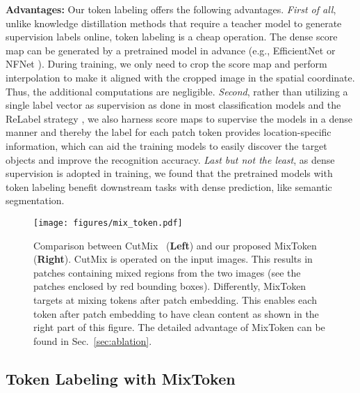 \documentclass{article}
\newcommand{\myPara}[1]{\noindent\textbf{#1:}}
\begin{document}
\myPara{Advantages} Our token labeling offers the following advantages. 
\emph{First of all}, unlike knowledge distillation methods that require a teacher model to generate supervision labels online, 
token labeling is a cheap operation. 
The dense score map can be generated by a pretrained model in advance
(e.g., EfficientNet \cite{tan2019efficientnet} or NFNet \cite{brock2021high}).
During training, we only need to crop the score map and perform interpolation to make it aligned with the cropped image in the spatial coordinate.
Thus, the additional computations are negligible.
\emph{Second}, rather than utilizing a single label vector as supervision as done in most classification models 
and the ReLabel strategy \cite{yun2021relabel},
we also harness score maps to supervise the models in a dense manner and thereby
the label for each patch token provides location-specific information, 
which can aid the training models to easily discover the target objects and improve the recognition accuracy.
\emph{Last but not the least}, as dense supervision is adopted in training, 
we found that the pretrained models with token labeling benefit downstream tasks with dense prediction, like semantic segmentation.



\begin{SCfigure}
\caption{Comparison between CutMix~\cite{yun2019cutmix} (\textbf{Left}) and our proposed MixToken (\textbf{Right}).
    CutMix is operated on the input images. This results in patches containing mixed regions from the two images
    (see the patches enclosed by red bounding boxes).
    Differently, MixToken targets at mixing tokens after patch embedding. This enables each token
    after patch embedding to have clean content as shown in the right part of this figure. The detailed advantage
    of MixToken can be found in Sec.~\ref{sec:ablation}.}
    \texttt{[image: figures/mix\_token.pdf]}
    \label{fig:mix_token}
\end{SCfigure}

\subsection{Token Labeling with MixToken}
\end{document}
